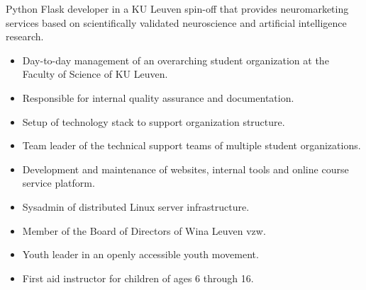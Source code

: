 \documentclass[10pt,a4paper,ragged2e]{altacv}
\begin{document}
    \divider


    Python Flask developer in a KU Leuven spin-off that provides neuromarketing services based on scientifically validated
    neuroscience and artificial intelligence research.

    \divider



    \divider



    \begin{itemize}
        \item Day-to-day management of an overarching student organization at the Faculty of Science of KU Leuven.
        \item Responsible for internal quality assurance and documentation.
        \item Setup of technology stack to support organization structure.
    \end{itemize}

    \divider


    \begin{itemize}
        \item Team leader of the technical support teams of multiple student organizations.
        \item Development and maintenance of websites, internal tools and online course service platform.
        \item Sysadmin of distributed Linux server infrastructure.
        \item Member of the Board of Directors of Wina Leuven vzw.
    \end{itemize}

    \divider

    \begin{itemize}
        \item Youth leader in an openly accessible youth movement.
        \item First aid instructor for children of ages 6 through 16.
    \end{itemize}
\end{document}
